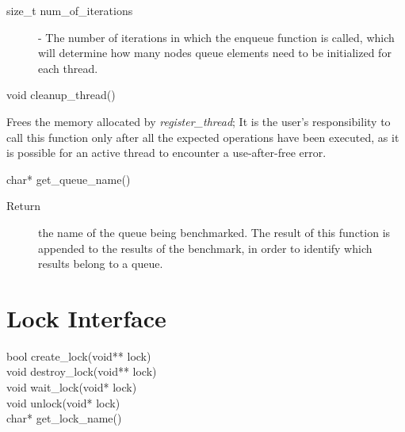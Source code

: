 \begin{description}
\begin{description}
		\item[size\_t num\_of\_iterations] - The number of iterations in which the enqueue function is called, which will determine how many nodes queue elements need to be initialized for each thread.
	\end{description}
\item void cleanup\_thread()
	\begin{description}
		\item Frees the memory allocated by \emph{register\_thread}; It is the user's responsibility to call this function only after all the expected operations have been executed, as it is possible for an active thread to encounter a use-after-free error.
	\end{description}
\item char* get\_queue\_name()
	\begin{description}
		\item[Return] the name of the queue being benchmarked. The result of
    this function is appended to the results of the benchmark, in order to
    identify which results belong to a queue.
	\end{description}
\end{description}    

\section{Lock Interface}
\label{sec:lock_interface}
\begin{description}
\item[bool create\_lock(void** lock)]
\item[void destroy\_lock(void** lock)]

\item[void wait\_lock(void* lock)]
\item[void unlock(void* lock)]
\item[char* get\_lock\_name()]
\end{description}